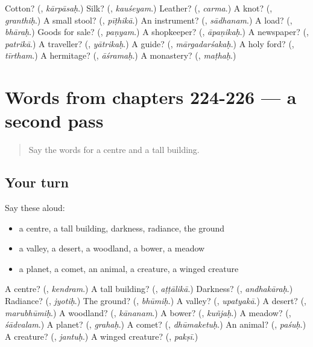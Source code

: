 \begin{tcolorbox}[breakable,colback=teal!4,colframe=teal!35!black,title={Before you move on}]
Cotton? (\textbf{}, \emph{kārpāsaḥ}.) Silk? (\textbf{}, \emph{kauśeyam}.) Leather? (\textbf{}, \emph{carma}.) A knot? (\textbf{}, \emph{granthiḥ}.) A small stool? (\textbf{}, \emph{pīṭhikā}.) An instrument? (\textbf{}, \emph{sādhanam}.) A load? (\textbf{}, \emph{bhāraḥ}.) Goods for sale? (\textbf{}, \emph{paṇyam}.) A shopkeeper? (\textbf{}, \emph{āpaṇikaḥ}.) A newspaper? (\textbf{}, \emph{patrikā}.) A traveller? (\textbf{}, \emph{yātrikaḥ}.) A guide? (\textbf{}, \emph{mārgadarśakaḥ}.) A holy ford? (\textbf{}, \emph{tīrtham}.) A hermitage? (\textbf{}, \emph{āśramaḥ}.) A monastery? (\textbf{}, \emph{maṭhaḥ}.)
\end{tcolorbox}
\section[(dialogue)]{Words from chapters 224-226 — a second pass}

\label{lesson:SA-R226-second-pass-words-from-chapters-224-226}



\begin{quote}
Say the words for a centre and a tall building.
\end{quote}

\subsection*{Your turn}
Say these aloud:

\begin{itemize}
\raggedright
  \item a centre, a tall building, darkness, radiance, the ground
  \item a valley, a desert, a woodland, a bower, a meadow
  \item a planet, a comet, an animal, a creature, a winged creature
\end{itemize}

\begin{tcolorbox}[breakable,colback=teal!4,colframe=teal!35!black,title={Before you move on}]
A centre? (\textbf{}, \emph{kendram}.) A tall building? (\textbf{}, \emph{aṭṭālikā}.) Darkness? (\textbf{}, \emph{andhakāraḥ}.) Radiance? (\textbf{}, \emph{jyotiḥ}.) The ground? (\textbf{}, \emph{bhūmiḥ}.) A valley? (\textbf{}, \emph{upatyakā}.) A desert? (\textbf{}, \emph{marubhūmiḥ}.) A woodland? (\textbf{}, \emph{kānanam}.) A bower? (\textbf{}, \emph{kuñjaḥ}.) A meadow? (\textbf{}, \emph{śādvalam}.) A planet? (\textbf{}, \emph{grahaḥ}.) A comet? (\textbf{}, \emph{dhūmaketuḥ}.) An animal? (\textbf{}, \emph{paśuḥ}.) A creature? (\textbf{}, \emph{jantuḥ}.) A winged creature? (\textbf{}, \emph{pakṣī}.)
\end{tcolorbox}

